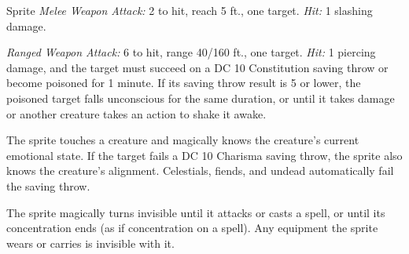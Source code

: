 \documentclass[10pt,a4paper,twoside,bg=print,twocolumn,openany,nodeprecatedcode]{dndbook}
\begin{document}
\begin{DndMonster}[float=t]{Sprite}
\DndMonsterBasics[
armor-class = {15 (\textit{leather armor})},
hit-points = {\DndDice{1d4}},
speed = {10 ft., fly 40 ft.}
]
\DndMonsterAbilityScores[
 str = 3,
 dex = 18,
 con = 10,
 int = 14,
 wis = 13,
 cha = 11
]
\DndMonsterDetails[
skills = {Perception +3, Stealth +8},
languages = {Common, Elvish, Sylvan},
challenge = 1/4,
]
\textsl{Melee Weapon Attack:} 2 to hit, reach 5 ft., one target. \textsl{Hit:} 1 slashing damage.

\textsl{Ranged Weapon Attack:} 6 to hit, range 40/160 ft., one target. \textsl{Hit:} 1 piercing damage, and the target must succeed on a DC 10 Constitution saving throw or become poisoned for 1 minute. If its saving throw result is 5 or lower, the poisoned target falls unconscious for the same duration, or until it takes damage or another creature takes an action to shake it awake.

The sprite touches a creature and magically knows the creature's current emotional state. If the target fails a DC 10 Charisma saving throw, the sprite also knows the creature's alignment. Celestials, fiends, and undead automatically fail the saving throw.

The sprite magically turns invisible until it attacks or casts a spell, or until its concentration ends (as if concentration on a spell). Any equipment the sprite wears or carries is invisible with it.

\end{DndMonster}
\end{document}
